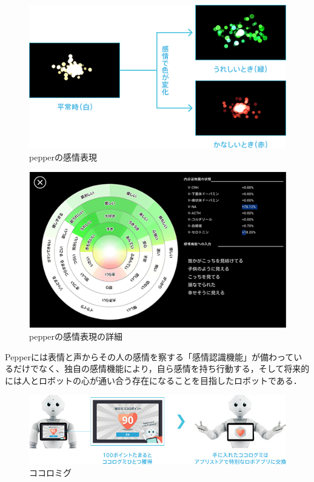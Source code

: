 \begin{figure}[h]
\centering
\includegraphics[width=15cm]{figemotion3.png}
\caption{pepperの感情表現}\label{図}
\end{figure}

\begin{figure}[h]
\centering
\includegraphics[width=15cm]{figemotion4.png}
\caption{pepperの感情表現の詳細}\label{図}
\end{figure}


Pepperには表情と声からその人の感情を察する「感情認識機能」が備わっているだけでなく、独自の感情機能により，自ら感情を持ち行動する，そして将来的には人とロボットの心が通い合う存在になることを目指したロボットである．

\begin{figure}[h]
\centering
\includegraphics[width=15cm]{figemotion6.jpg}
\caption{ココロミグ}\label{図}
\end{figure}


